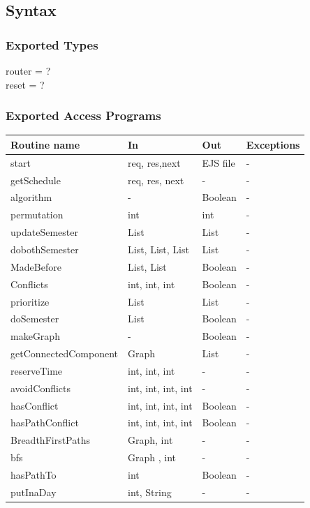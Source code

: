 \documentclass[11pt, oneside]{article}
\begin{document}
\subsection* {Syntax}
\subsubsection* {Exported Types}
router = ? \\
reset  = ? \\

\subsubsection* {Exported Access Programs}
\begin{tabular}{| l | l | l | l |}
\hline
\textbf{Routine name} & \textbf{In} & \textbf{Out} & \textbf{Exceptions}\\
\hline
start & req, res,next & EJS file & -\\
\hline
getSchedule & req, res, next & - & - \\
\hline
algorithm & - & Boolean & - \\
\hline
permutation & int & int & - \\
\hline
updateSemester & List & List & - \\
\hline
dobothSemester & List, List, List & List & - \\
\hline
MadeBefore & List, List & Boolean & - \\
\hline
Conflicts & int, int, int & Boolean & - \\
\hline
prioritize & List & List & - \\
\hline
doSemester & List & Boolean & - \\
\hline
makeGraph & - & Boolean & - \\
\hline
getConnectedComponent & Graph & List & - \\
\hline
reserveTime & int, int, int & - & - \\
\hline
avoidConflicts & int, int, int, int & - & - \\
\hline
hasConflict & int, int, int, int & Boolean & - \\
\hline
hasPathConflict & int, int, int, int & Boolean & - \\
\hline
BreadthFirstPaths & Graph, int & - & - \\
\hline
bfs & Graph , int & - & - \\
\hline
hasPathTo & int & Boolean & - \\
\hline
putInaDay & int, String & - & - \\
\hline



\end{tabular}
\end{document}
